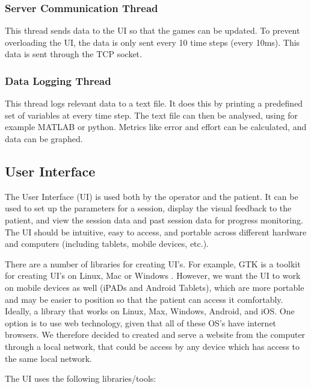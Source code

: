 \documentclass[12pt]{report}
\begin{document}
	\subsubsection{Server Communication Thread}
	
	This thread sends data to the UI so that the games can be updated. To prevent overloading the UI, the data is only sent every 10 time steps (every 10ms). This data is sent through the TCP socket. 	
	
	\subsubsection{Data Logging Thread}
	This thread logs relevant data to a text file. It does this by printing a predefined set of variables at every time step. The text file can then be analysed, using for example MATLAB or python. Metrics like error and effort can be calculated, and data can be graphed. 
	
	\subsection{User Interface} 
	
	The User Interface (UI) is used both by the operator and the patient. It can be used to set up the parameters for a session, display the visual feedback to the patient, and  view the session data and past session data for progress monitoring. The UI should be intuitive, easy to access, and portable across different hardware and computers (including tablets, mobile devices, etc.).
	
	There are a number of libraries for creating UI's. For example, GTK is a toolkit for creating UI's on Linux, Mac or Windows \cite{TheGTKTeam2019}. However, we want the UI to work on mobile devices as well (iPADs and Android Tablets), which are more portable and may be easier to position so that the patient can access it comfortably. Ideally, a library that works on Linux, Max, Windows, Android, and iOS. One option is to use web technology, given that all of these OS's have internet browsers. We therefore decided to created and serve a website from the computer through a local network, that could be access by any device which has access to the same local network. 
	
	The UI uses the following libraries/tools:
	
\end{document}
